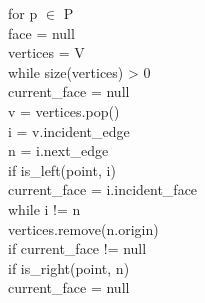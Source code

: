 \documentclass[english, fontsize=12pt, paper=a4, twoside=false, draft=true, pagesize=auto, version=last, DIV=16]{scrartcl}
\theoremstyle{break}
\begin{document}
for p $\in$ P\\
\hspace*{10mm}face = null\\
\hspace*{10mm}vertices = V\\
\hspace*{10mm}while size(vertices) > 0\\
\hspace*{10mm}\hspace*{10mm}current\_face = null\\
\hspace*{10mm}\hspace*{10mm}v = vertices.pop()\\
\hspace*{10mm}\hspace*{10mm}i = v.incident\_edge\\
\hspace*{10mm}\hspace*{10mm}n = i.next\_edge\\
\hspace*{10mm}\hspace*{10mm}if is\_left(point, i)\\
\hspace*{10mm}\hspace*{10mm}\hspace*{10mm}current\_face = i.incident\_face\\
\hspace*{10mm}\hspace*{10mm}while i != n\\
\hspace*{10mm}\hspace*{10mm}\hspace*{10mm}vertices.remove(n.origin)\\
\hspace*{10mm}\hspace*{10mm}\hspace*{10mm}if current\_face != null\\
\hspace*{10mm}\hspace*{10mm}\hspace*{10mm}\hspace*{10mm}if is\_right(point, n)\\
\hspace*{10mm}\hspace*{10mm}\hspace*{10mm}\hspace*{10mm}\hspace*{10mm}current\_face = null\\
\end{document}

